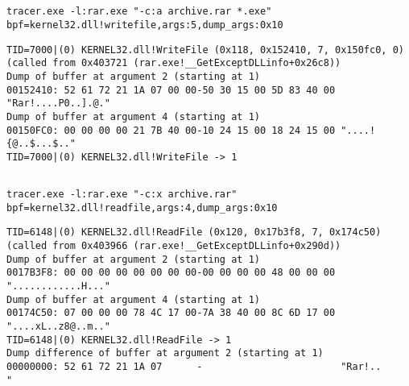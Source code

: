 \subsection{}

\begin{lstlisting}
tracer.exe -l:rar.exe "-c:a archive.rar *.exe" bpf=kernel32.dll!writefile,args:5,dump_args:0x10
\end{lstlisting}


\begin{lstlisting}
TID=7000|(0) KERNEL32.dll!WriteFile (0x118, 0x152410, 7, 0x150fc0, 0) (called from 0x403721 (rar.exe!__GetExceptDLLinfo+0x26c8))
Dump of buffer at argument 2 (starting at 1)
00152410: 52 61 72 21 1A 07 00 00-50 30 15 00 5D 83 40 00 "Rar!....P0..].@."
Dump of buffer at argument 4 (starting at 1)
00150FC0: 00 00 00 00 21 7B 40 00-10 24 15 00 18 24 15 00 "....!{@..$...$.."
TID=7000|(0) KERNEL32.dll!WriteFile -> 1
\end{lstlisting}

\subsection{}

\begin{lstlisting}
tracer.exe -l:rar.exe "-c:x archive.rar" bpf=kernel32.dll!readfile,args:4,dump_args:0x10
\end{lstlisting}


\begin{lstlisting}
TID=6148|(0) KERNEL32.dll!ReadFile (0x120, 0x17b3f8, 7, 0x174c50) (called from 0x403966 (rar.exe!__GetExceptDLLinfo+0x290d))
Dump of buffer at argument 2 (starting at 1)
0017B3F8: 00 00 00 00 00 00 00 00-00 00 00 00 48 00 00 00 "............H..."
Dump of buffer at argument 4 (starting at 1)
00174C50: 07 00 00 00 78 4C 17 00-7A 38 40 00 8C 6D 17 00 "....xL..z8@..m.."
TID=6148|(0) KERNEL32.dll!ReadFile -> 1
Dump difference of buffer at argument 2 (starting at 1)
00000000: 52 61 72 21 1A 07      -                        "Rar!..          "
\end{lstlisting}



